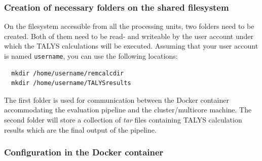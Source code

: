\documentclass[12pt,a4paper]{scrartcl}
\begin{document}
 \subsubsection{Creation of necessary folders on the shared filesystem}
 \label{subsubsec:create_shared_folder}
 On the filesystem accessible from all the processing units, two folders need to be created.
 Both of them need to be read- and writeable by the user account under which the TALYS calculations will be executed.
 Assuming that your user account is named \verb#username#, you can use the following locations:
\begin{verbatim}
  mkdir /home/username/remcalcdir
  mkdir /home/username/TALYSresults
\end{verbatim}
The first folder  is used for communication between the Docker container accommodating the evaluation pipeline and the cluster/multicore machine.
The second folder  will store a collection of \textit{tar} files containing TALYS calculation results which are the final output of the pipeline.
 
 \subsubsection{Configuration in the Docker container}
 \label{subsubsec:install_remote_config_container}
 
\end{document}
